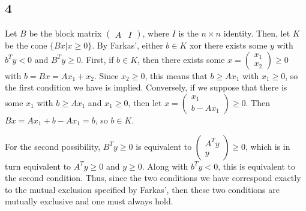 \documentclass{article}
\newcommand{\openm}{\begin{pmatrix}}
\newcommand{\closem}{\end{pmatrix}}
\begin{document}
\subsection*{4}
Let $B$ be the block matrix $\openm A&I\closem$, where $I$ is the $n\times n$ identity. Then, let $K$ be the cone $\{Bx|x\geq0\}$. By Farkas', either $b\in K$ xor there exists some $y$ with $b^Ty<0$ and $B^Ty\geq0$. First, if $b\in K$, then there exists some $x=\openm x_1\\x_2\closem\geq0$ with $b=Bx=Ax_1+x_2$. Since $x_2\geq0$, this means that $b\geq Ax_1$ with $x_1\geq0$, so the first condition we have is implied. Conversely, if we suppose that there is some $x_1$ with $b\geq Ax_1$ and $x_1\geq0$, then let $x=\openm x_1\\b-Ax_1\closem\geq0$. Then $Bx=Ax_1+b-Ax_1=b$, so $b\in K$. 

For the second possibility, $B^Ty\geq0$ is equivalent to $\openm A^Ty\\y\closem\geq0$, which is in turn equivalent to $A^Ty\geq0$ and $y\geq0$. Along with $b^Ty<0$, this is equivalent to the second condition. Thus, since the two conditions we have correspond exactly to the mutual exclusion specified by Farkas', then these two conditions are mutually exclusive and one must always hold.
\end{document}
